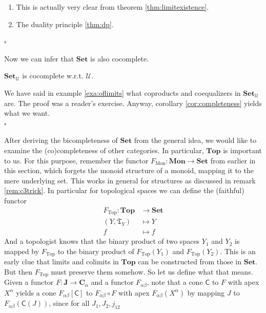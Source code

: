 \begin{prf}
\begin{enumerate}
\item[(1T)]
This is actually very clear from theorem \ref{thm:limitexistence}.
\item[(1I)]
The duality principle \ref{thm:dp}.
\end{enumerate}
\phantom{proven}
\hfill
$\square$
\end{prf}
Now we can infer that $\mathbf{Set}$ is also cocomplete.
\\
\begin{thm}
\label{thm:setcocomplete}
$\mathbf{Set}_{\mathcal{U}}$ is cocomplete w.r.t.
$\mathcal{U}$.
\end{thm}
\begin{prf}
We have said in example \ref{exa:oflimits} what coproducts and coequalizers in $\mathbf{Set}_{\mathcal{U}}$ are.
The proof was a reader's exercise.
Anyway, corollary \ref{cor:completeness} yields what we want.
\\
\phantom{proven}
\hfill
$\square$
\end{prf}
After deriving the bicompleteness of $\mathbf{Set}$ from the general idea, we would like to examine the (co)completeness of other categories.
In particular, $\mathbf{Top}$ is important to us.
For this purpose, remember the functor $F_{\mathrm{Mon}} \colon \mathbf{Mon} \rightarrow \mathbf{Set}$ from earlier in this section, which forgets the monoid structure of a monoid, mapping it to the mere underlying set.
This works in general for {\glqq}structures{\grqq} as discussed in remark \ref{rem:c3trick}.
In particular for topological spaces we can define the (faithful) functor
\begin{align*}
  F_{\mathrm{Top}}
  \colon
  \mathbf{Top}
  &\rightarrow
  \mathbf{Set}
  \\
  (Y,\mathfrak{T}_{Y})
  &\mapsto
  Y
  \\
  f
  &\mapsto
  f
\end{align*}
And a topologist knows that the binary product of two spaces $Y_{1}$ and $Y_{2}$ is mapped by $F_{\mathrm{Top}}$ to the binary product of $F_{\mathrm{Top}}(Y_{1})$ and $F_{\mathrm{Top}}(Y_{2})$.
This is an early clue that limits and colimits in $\mathbf{Top}$ can be constructed from those in $\mathbf{Set}$.
But then $F_{\mathrm{Top}}$ must preserve them somehow.
So let us define what that means.
Given a functor $F \colon \mathbf{J} \rightarrow \mathbf{C}_{\alpha}$ and a functor $F_{\alpha\beta}$, note that a cone $\mathsf{C}$ to $F$ with apex $X^{\alpha}$ yields a cone $F_{\alpha\beta}[\mathsf{C}]$ to $F_{\alpha\beta} \circ F$ with apex $F_{\alpha\beta}(X^{\alpha})$ by mapping $J$ to $F_{\alpha\beta}(\mathsf{C}(J))$, since for all $J_{1},J_{2},j_{12}$
